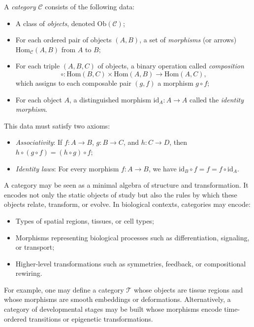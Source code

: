 \begin{definition}
A \emph{category} $\mathcal{C}$ consists of the following data:
\begin{itemize}
  \item A class of \emph{objects}, denoted $\mathrm{Ob}(\mathcal{C})$;
  \item For each ordered pair of objects $(A, B)$, a set of \emph{morphisms} (or arrows) $\mathrm{Hom}_{\mathcal{C}}(A, B)$ from $A$ to $B$;
  \item For each triple $(A, B, C)$ of objects, a binary operation called \emph{composition}
    \[
    \circ : \mathrm{Hom}(B, C) \times \mathrm{Hom}(A, B) \to \mathrm{Hom}(A, C),
    \]
    which assigns to each composable pair $(g, f)$ a morphism $g \circ f$;
  \item For each object $A$, a distinguished morphism $\mathrm{id}_A : A \to A$ called the \emph{identity morphism}.
\end{itemize}
This data must satisfy two axioms:
\begin{itemize}
  \item \emph{Associativity}: If $f : A \to B$, $g : B \to C$, and $h : C \to D$, then $h \circ (g \circ f) = (h \circ g) \circ f$;
  \item \emph{Identity laws}: For every morphism $f : A \to B$, we have $\mathrm{id}_B \circ f = f = f \circ \mathrm{id}_A$.
\end{itemize}
\end{definition}

A category may be seen as a minimal algebra of structure and transformation. It encodes not only the static objects of study but also the rules by which these objects relate, transform, or evolve. In biological contexts, categories may encode:
\begin{itemize}
  \item Types of spatial regions, tissues, or cell types;
  \item Morphisms representing biological processes such as differentiation, signaling, or transport;
  \item Higher-level transformations such as symmetries, feedback, or compositional rewiring.
\end{itemize}

For example, one may define a category $\mathcal{T}$ whose objects are tissue regions and whose morphisms are smooth embeddings or deformations. Alternatively, a category of developmental stages may be built whose morphisms encode time-ordered transitions or epigenetic transformations.

